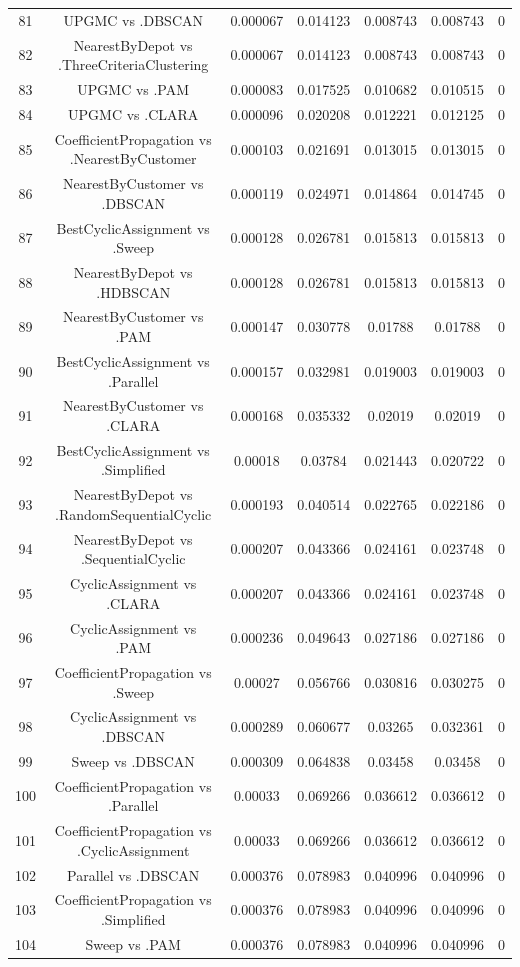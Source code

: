 \documentclass[a4paper,10pt]{article}
\begin{document}
\begin{landscape}
\begin{table}[!htp]
\begin{tabular}{ccccccc}
81&UPGMC vs .DBSCAN&0.000067&0.014123&0.008743&0.008743&0\\
82&NearestByDepot vs .ThreeCriteriaClustering&0.000067&0.014123&0.008743&0.008743&0\\
83&UPGMC vs .PAM&0.000083&0.017525&0.010682&0.010515&0\\
84&UPGMC vs .CLARA&0.000096&0.020208&0.012221&0.012125&0\\
85&CoefficientPropagation vs .NearestByCustomer&0.000103&0.021691&0.013015&0.013015&0\\
86&NearestByCustomer vs .DBSCAN&0.000119&0.024971&0.014864&0.014745&0\\
87&BestCyclicAssignment vs .Sweep&0.000128&0.026781&0.015813&0.015813&0\\
88&NearestByDepot vs .HDBSCAN&0.000128&0.026781&0.015813&0.015813&0\\
89&NearestByCustomer vs .PAM&0.000147&0.030778&0.01788&0.01788&0\\
90&BestCyclicAssignment vs .Parallel&0.000157&0.032981&0.019003&0.019003&0\\
91&NearestByCustomer vs .CLARA&0.000168&0.035332&0.02019&0.02019&0\\
92&BestCyclicAssignment vs .Simplified&0.00018&0.03784&0.021443&0.020722&0\\
93&NearestByDepot vs .RandomSequentialCyclic&0.000193&0.040514&0.022765&0.022186&0\\
94&NearestByDepot vs .SequentialCyclic&0.000207&0.043366&0.024161&0.023748&0\\
95&CyclicAssignment vs .CLARA&0.000207&0.043366&0.024161&0.023748&0\\
96&CyclicAssignment vs .PAM&0.000236&0.049643&0.027186&0.027186&0\\
97&CoefficientPropagation vs .Sweep&0.00027&0.056766&0.030816&0.030275&0\\
98&CyclicAssignment vs .DBSCAN&0.000289&0.060677&0.03265&0.032361&0\\
99&Sweep vs .DBSCAN&0.000309&0.064838&0.03458&0.03458&0\\
100&CoefficientPropagation vs .Parallel&0.00033&0.069266&0.036612&0.036612&0\\
101&CoefficientPropagation vs .CyclicAssignment&0.00033&0.069266&0.036612&0.036612&0\\
102&Parallel vs .DBSCAN&0.000376&0.078983&0.040996&0.040996&0\\
103&CoefficientPropagation vs .Simplified&0.000376&0.078983&0.040996&0.040996&0\\
104&Sweep vs .PAM&0.000376&0.078983&0.040996&0.040996&0\\

\end{tabular}
\end{table}
\end{landscape}
\end{document}

